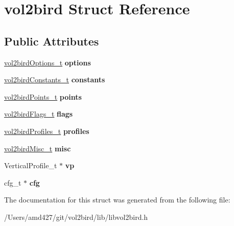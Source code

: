 \hypertarget{structvol2bird}{}\section{vol2bird Struct Reference}
\label{structvol2bird}
\subsection*{Public Attributes}
\begin{DoxyCompactItemize}
\item 
\mbox{\label{structvol2bird_a1cfd9f613df2634f25f5c55094508a8c}} 
\mbox{\hyperlink{structvol2birdOptions}{vol2bird\+Options\+\_\+t}} {\bfseries options}
\item 
\mbox{\label{structvol2bird_a88d818ce79005c1238ed1c672ddbcd75}} 
\mbox{\hyperlink{structvol2birdConstants}{vol2bird\+Constants\+\_\+t}} {\bfseries constants}
\item 
\mbox{\label{structvol2bird_a4ebda6ee31712a57b1d0d84995b9cd3d}} 
\mbox{\hyperlink{structvol2birdPoints}{vol2bird\+Points\+\_\+t}} {\bfseries points}
\item 
\mbox{\label{structvol2bird_a121d69a08c309f42a494b5f67c6b3fd0}} 
\mbox{\hyperlink{structvol2birdFlags}{vol2bird\+Flags\+\_\+t}} {\bfseries flags}
\item 
\mbox{\label{structvol2bird_a29d070cdf58424fbaf11b38cdc9892c0}} 
\mbox{\hyperlink{structvol2birdProfiles}{vol2bird\+Profiles\+\_\+t}} {\bfseries profiles}
\item 
\mbox{\label{structvol2bird_acd87ee205896a38ba3c83263100e1d54}} 
\mbox{\hyperlink{structvol2birdMisc}{vol2bird\+Misc\+\_\+t}} {\bfseries misc}
\item 
\mbox{\label{structvol2bird_a95154844e42af3f6a973186517b2d5d3}} 
Vertical\+Profile\+\_\+t $\ast$ {\bfseries vp}
\item 
\mbox{\label{structvol2bird_a22fbee9e0473bc98ae8e7c9b893fb14c}} 
cfg\+\_\+t $\ast$ {\bfseries cfg}
\end{DoxyCompactItemize}


The documentation for this struct was generated from the following file\+:\begin{DoxyCompactItemize}
\item 
/\+Users/amd427/git/vol2bird/lib/libvol2bird.\+h\end{DoxyCompactItemize}
